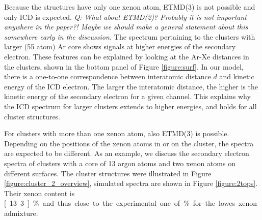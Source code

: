 Because the structures have only one xenon atom, ETMD(3) is not possible
and only ICD is expected. 
{\it Q: What about ETMD(2)? Probably it is not important anywhere in the paper?!
Maybe we should make a general statement about this somewhere early in the discussion.}
The spectrum pertaining to the clusters with larger (55 atom) Ar core shows
signals at higher energies of the secondary electron. These features
can be explained by looking at the Ar-Xe distances in the clusters, shown
in the bottom panel of Figure \ref{figure:surf}. 
In our model, there is a one-to-one correspondence between interatomic distance $d$ and kinetic energy of the ICD electron.
The larger the interatomic distance, the higher is the
kinetic energy of the secondary electron for a given channel.
This explains why the ICD spectrum for larger clusters extends to higher energies, and holds for all cluster structures.

For clusters with more than one xenon atom, also ETMD(3) is possible.
Depending on the positions of the xenon
atoms in or on the cluster, the spectra are expected to be different.
As an example, we discuss the secondary electron spectra of 
clusters with a core of 13 argon atoms and two xenon atoms on different
surfaces. The cluster structures were illustrated in Figure \ref{figure:cluster_2_overview}, 
simulated spectra are shown in Figure
\ref{figure:2tops}. Their xenon content is \unit[13.3]{\%} and thus
close to the experimental one of \unit[10-12]{\%} for the lowes xenon admixture.

